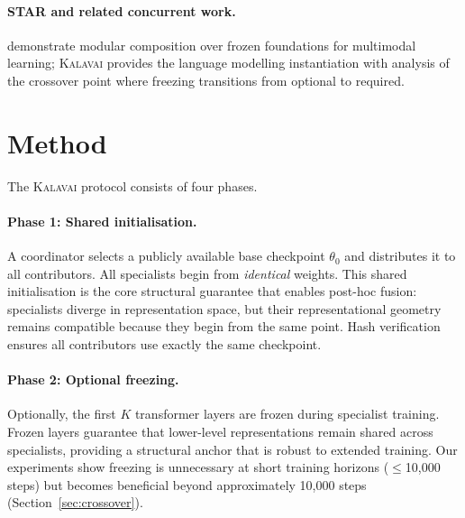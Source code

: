 \documentclass{article}
\newcommand{\kalavai}{\textsc{Kalavai}\xspace}
\begin{document}
\paragraph{STAR and related concurrent work.} \citet{qin2025star} demonstrate modular composition over frozen foundations for multimodal learning; \kalavai provides the language modelling instantiation with analysis of the crossover point where freezing transitions from optional to required.

\section{Method}
\label{sec:method}

The \kalavai protocol consists of four phases.

\paragraph{Phase 1: Shared initialisation.} A coordinator selects a publicly available base checkpoint $\theta_0$ and distributes it to all contributors. All specialists begin from \emph{identical} weights. This shared initialisation is the core structural guarantee that enables post-hoc fusion: specialists diverge in representation space, but their representational geometry remains compatible because they begin from the same point. Hash verification ensures all contributors use exactly the same checkpoint.

\paragraph{Phase 2: Optional freezing.} Optionally, the first $K$ transformer layers are frozen during specialist training. Frozen layers guarantee that lower-level representations remain shared across specialists, providing a structural anchor that is robust to extended training. Our experiments show freezing is unnecessary at short training horizons ($\leq$10,000 steps) but becomes beneficial beyond approximately 10,000 steps (Section~\ref{sec:crossover}).
\end{document}
